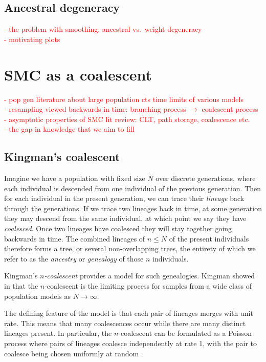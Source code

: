 \documentclass[fleqn]{article}
\begin{document}
\subsection{Ancestral degeneracy}
\textcolor{red}{
- the problem with smoothing: ancestral vs.\ weight degeneracy\\
- motivating plots
}

\section{SMC as a coalescent}
\textcolor{red}{
- pop gen literature about large population cts time limits of various models\\
- resampling viewed backwards in time: branching process $\to$ coalescent process\\
- asymptotic properties of SMC lit review: CLT, path storage, coalescence etc.\\
- the gap in knowledge that we aim to fill\\
}

\subsection{Kingman's coalescent}
Imagine we have a population with fixed size $N$ over discrete generations, where each individual is descended from one individual of the previous generation. Then for each individual in the present generation, we can trace their \emph{lineage} back through the generations. 
If we trace two lineages back in time, at some generation they may descend from the same individual, at which point we say they have \emph{coalesced}. Once two lineages have coalesced they will stay together going backwards in time.
The combined lineages of $n\leq N$ of the present individuals therefore forms a tree, or several non-overlapping trees, the entirety of which we refer to as the \emph{ancestry} or \emph{genealogy} of those $n$ individuals.

Kingman's \emph{$n$-coalescent} provides a model for such genealogies. Kingman showed in \citep{kingman1982gene, kingman1982coal, kingman1982exch} that  the $n$-coalescent is the limiting process for samples from a wide class of population models as $N\to\infty$.

The defining feature of the model is that each pair of lineages merges with unit rate. This means that many coalescences occur while there are many distinct lineages present.
In particular, the $n$-coalescent can be formulated as a Poisson process where pairs of lineages coalesce independently at rate 1, with the pair to coalesce being chosen uniformly at random \citep[Section 3.2]{wakeley2009}.
\end{document}
